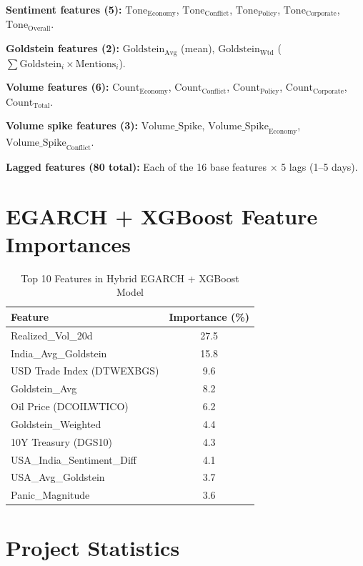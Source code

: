 \documentclass[11pt]{article}
\begin{document}
\textbf{Sentiment features (5):} $\text{Tone}_\text{Economy}$, $\text{Tone}_\text{Conflict}$, $\text{Tone}_\text{Policy}$, $\text{Tone}_\text{Corporate}$, $\text{Tone}_\text{Overall}$.

\textbf{Goldstein features (2):} $\text{Goldstein}_{\text{Avg}}$ (mean), $\text{Goldstein}_{\text{Wtd}}$ ($\sum \text{Goldstein}_i \times \text{Mentions}_i$).

\textbf{Volume features (6):} $\text{Count}_\text{Economy}$, $\text{Count}_\text{Conflict}$, $\text{Count}_\text{Policy}$, $\text{Count}_\text{Corporate}$, $\text{Count}_\text{Total}$.

\textbf{Volume spike features (3):} $\text{Volume\_Spike}$, $\text{Volume\_Spike}_\text{Economy}$, $\text{Volume\_Spike}_\text{Conflict}$.

\textbf{Lagged features (80 total):} Each of the 16 base features $\times$ 5 lags (1--5 days).

\section{EGARCH + XGBoost Feature Importances}
\label{app:egarch}

\begin{table}[H]
\centering
\small
\caption{Top 10 Features in Hybrid EGARCH + XGBoost Model}
\begin{tabular}{lc}
\toprule
\textbf{Feature} & \textbf{Importance (\%)} \\
\midrule
Realized\_Vol\_20d & 27.5 \\
India\_Avg\_Goldstein & 15.8 \\
USD Trade Index (DTWEXBGS) & 9.6 \\
Goldstein\_Avg & 8.2 \\
Oil Price (DCOILWTICO) & 6.2 \\
Goldstein\_Weighted & 4.4 \\
10Y Treasury (DGS10) & 4.3 \\
USA\_India\_Sentiment\_Diff & 4.1 \\
USA\_Avg\_Goldstein & 3.7 \\
Panic\_Magnitude & 3.6 \\
\bottomrule
\end{tabular}
\end{table}

\section{Project Statistics}
\label{app:stats}
\end{document}
